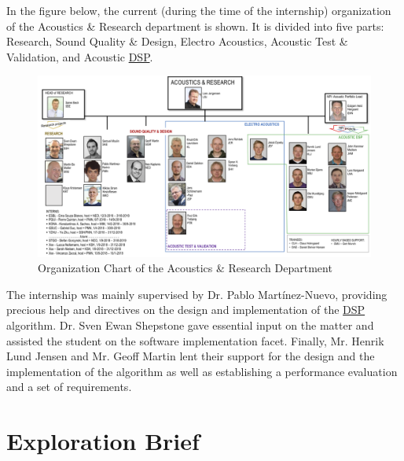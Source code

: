 In the figure below, the current (during the time of the internship) organization of the Acoustics \& Research department is shown. It is divided into five parts: Research, Sound Quality \& Design, Electro Acoustics, Acoustic Test \& Validation, and Acoustic \hyperlink{DSP}{DSP}.

\begin{figure}[ht!]
		\centering
			\includegraphics[scale =0.25]{research.png}
			\caption{Organization Chart of the Acoustics \& Research Department}\label{Figure 2.2}

\end{figure}

The internship was mainly supervised by Dr. Pablo Martínez-Nuevo, providing precious help and directives on the design and implementation of the \hyperlink{DSP}{DSP} algorithm. Dr. Sven Ewan Shepstone gave essential input on the matter and assisted the student on the software implementation facet. Finally, Mr. Henrik Lund Jensen and Mr. Geoff Martin lent their support for the design and the implementation of the algorithm as well as establishing a performance evaluation and a set of requirements.

\newpage


\section{Exploration Brief}

